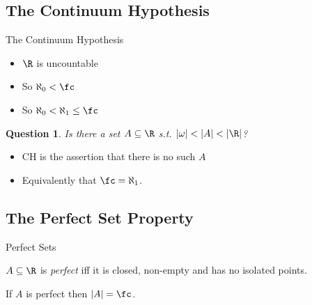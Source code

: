 \documentclass{beamer}
\newtheorem*{question}{Question}
\begin{document}
\subsection{The Continuum Hypothesis}

\begin{frame}{The Continuum Hypothesis}

\begin{fact}
\begin{itemize}
  \item $\R$ is uncountable
  \item So $\aleph_0 < \fc$
  \item So $\aleph_0 < \aleph_1 \leq \fc$
\end{itemize}
\end{fact}

\begin{question}
Is there a set $A \subseteq \R$ s.t. $|\omega| < |A| < |\R|$?
\end{question}

\begin{definition}
\begin{itemize}
  \item CH is the assertion that there is no such $A$
  \item Equivalently that $\fc = \aleph_1$.
\end{itemize}
\end{definition}

\end{frame}

\subsection{The Perfect Set Property}

\begin{frame}{Perfect Sets}

\begin{definition}
$A\subseteq\R$ is \emph{perfect} iff it is closed, non-empty
and has no isolated points.
\end{definition}

\begin{lemma}
If $A$ is perfect then $|A| = \fc$.
\end{lemma}

\end{frame}
\end{document}
